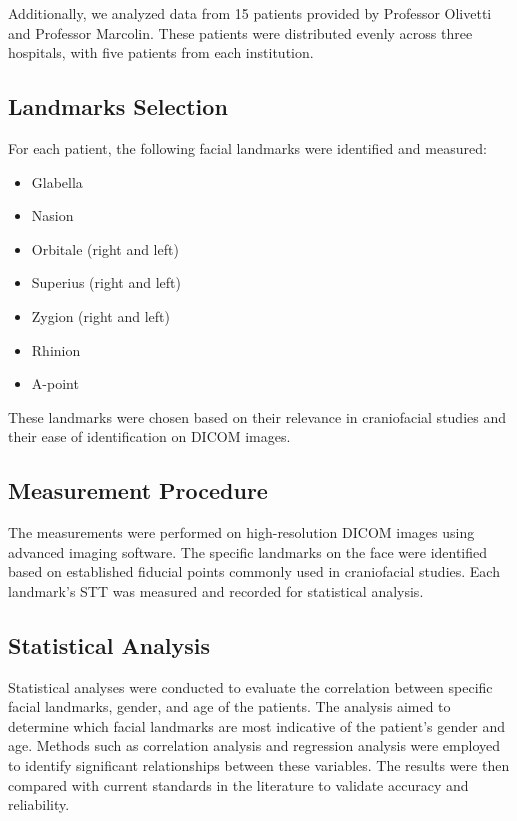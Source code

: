 \documentclass{article_saj}
\begin{document}
Additionally, we analyzed data from 15 patients provided by Professor Olivetti and Professor Marcolin. These patients were distributed evenly across three hospitals, with five patients from each institution. 

\subsection{Landmarks Selection}

For each patient, the following facial landmarks were identified and measured:

\begin{itemize}
    \item Glabella
    \item Nasion
    \item Orbitale (right and left)
    \item Superius (right and left)
    \item Zygion (right and left)
    \item Rhinion
    \item A-point
\end{itemize}

These landmarks were chosen based on their relevance in craniofacial studies and their ease of identification on DICOM images.

\subsection{Measurement Procedure}

The measurements were performed on high-resolution DICOM images using advanced imaging software. The specific landmarks on the face were identified based on established fiducial points commonly used in craniofacial studies. Each landmark's STT was measured and recorded for statistical analysis.

\subsection{Statistical Analysis}

Statistical analyses were conducted to evaluate the correlation between specific facial landmarks, gender, and age of the patients. The analysis aimed to determine which facial landmarks are most indicative of the patient's gender and age. Methods such as correlation analysis and regression analysis were employed to identify significant relationships between these variables. The results were then compared with current standards in the literature to validate accuracy and reliability.
\end{document}
